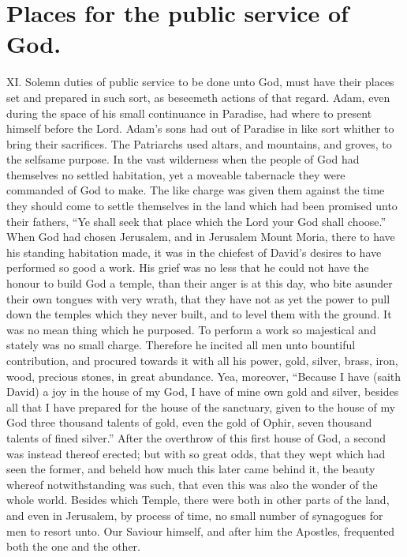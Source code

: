 \section*{Places for the public service of God.}
XI. Solemn duties of public service to be done unto God, must have their places set and prepared in such sort, as beseemeth actions of that regard. Adam, even during the space of his small continuance in Paradise, had where to present himself before the Lord. Adam’s sons had out of Paradise in like sort whither to bring their sacrifices. The Patriarchs used altars, and mountains, and groves, to the selfsame purpose.
In the vast wilderness when the people of God had themselves no settled habitation, yet a moveable tabernacle they were commanded of God to make. The like charge was given them against the time they should come to settle themselves in the land which had been promised unto their fathers, “Ye shall seek that place which the Lord your God shall choose.” When God had chosen Jerusalem, and in Jerusalem Mount Moria, there to have his standing habitation made, it was in the chiefest of David’s desires to have performed so good a work. His grief was no less that he could not have the honour to build God a temple, than their anger is at this day, who bite asunder their own tongues with very wrath, that they have not as yet the power to pull down the temples which they never built, and to level them with the ground. It was no mean thing which he purposed. To perform a work so majestical and stately was no small charge. Therefore he incited all men unto bountiful contribution, and procured towards it with all his power, gold, silver, brass, iron, wood, precious stones, in great abundance. Yea, moreover, “Because I have (saith David) a joy in the house of my God, I have of mine own gold and silver, besides all that I have prepared for the house of the sanctuary, given to the house of my God three thousand talents of gold, even the gold of Ophir, seven thousand talents of fined silver.” After the overthrow of this first house of God, a second was instead thereof erected; but with so great odds, that they wept which had seen the former, and beheld  how much this later came behind it, the beauty whereof notwithstanding was such, that even this was also the wonder of the whole world. Besides which Temple, there were both in other parts of the land, and even in Jerusalem, by process of time, no small number of synagogues for men to resort unto. Our Saviour himself, and after him the Apostles, frequented both the one and the other.
